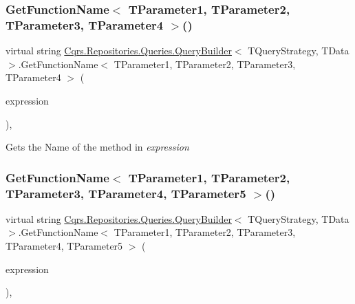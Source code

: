 \subsubsection{\texorpdfstring{Get\+Function\+Name$<$ T\+Parameter1, T\+Parameter2, T\+Parameter3, T\+Parameter4 $>$()}{GetFunctionName< TParameter1, TParameter2, TParameter3, TParameter4 >()}}
{\footnotesize\ttfamily virtual string \hyperlink{classCqrs_1_1Repositories_1_1Queries_1_1QueryBuilder}{Cqrs.\+Repositories.\+Queries.\+Query\+Builder}$<$ T\+Query\+Strategy, T\+Data $>$.Get\+Function\+Name$<$ T\+Parameter1, T\+Parameter2, T\+Parameter3, T\+Parameter4 $>$ (\begin{DoxyParamCaption}\item[{Func$<$ T\+Parameter1, T\+Parameter2, T\+Parameter3, T\+Parameter4, T\+Query\+Strategy $>$}]{expression }\end{DoxyParamCaption})\hspace{0.3cm}{\ttfamily [protected]}, {\ttfamily [virtual]}}



Gets the Name of the method in {\itshape expression}  

\mbox{\label{classCqrs_1_1Repositories_1_1Queries_1_1QueryBuilder_a0228422245afb7fe388114236bb1aefa_a0228422245afb7fe388114236bb1aefa}} 
\subsubsection{\texorpdfstring{Get\+Function\+Name$<$ T\+Parameter1, T\+Parameter2, T\+Parameter3, T\+Parameter4, T\+Parameter5 $>$()}{GetFunctionName< TParameter1, TParameter2, TParameter3, TParameter4, TParameter5 >()}}
{\footnotesize\ttfamily virtual string \hyperlink{classCqrs_1_1Repositories_1_1Queries_1_1QueryBuilder}{Cqrs.\+Repositories.\+Queries.\+Query\+Builder}$<$ T\+Query\+Strategy, T\+Data $>$.Get\+Function\+Name$<$ T\+Parameter1, T\+Parameter2, T\+Parameter3, T\+Parameter4, T\+Parameter5 $>$ (\begin{DoxyParamCaption}\item[{Func$<$ T\+Parameter1, T\+Parameter2, T\+Parameter3, T\+Parameter4, T\+Parameter5, T\+Query\+Strategy $>$}]{expression }\end{DoxyParamCaption})\hspace{0.3cm}{\ttfamily [protected]}, {\ttfamily [virtual]}}



